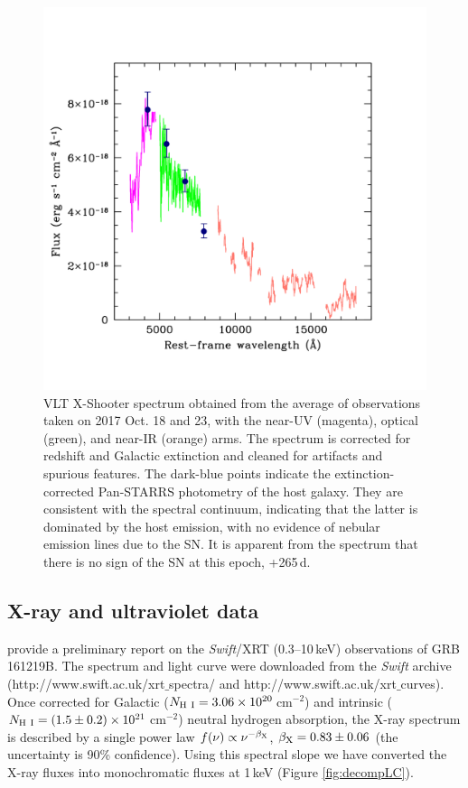 \documentclass[fleqn,usenatbib]{mnras}
\begin{document}
\begin{figure}
\centering
\includegraphics[scale=0.4]{plots/figure_E1_nebular.pdf}
\caption{VLT X-Shooter spectrum obtained from the average of observations taken on 2017 Oct. 18 and 23, with the near-UV (magenta), optical (green), and near-IR (orange) arms.  The spectrum is corrected for redshift and Galactic extinction and cleaned for artifacts and spurious features.  The dark-blue points indicate the extinction-corrected Pan-STARRS photometry of the host galaxy.  They are consistent with the spectral continuum, indicating that the latter is dominated by the host emission, with no evidence of nebular emission lines due to the SN. It is apparent from the spectrum that there is no sign of the SN at this epoch, +265\,d. }
\label{fig:latespec}
\end{figure}


\subsection{X-ray and ultraviolet data}

\citet{Mingo16} provide a preliminary report on the {\it Swift}/XRT (0.3--10\,keV) observations of GRB\,161219B.  The   spectrum and light curve were downloaded from  the {\it Swift} archive (http://www.swift.ac.uk/xrt$\_$spectra/
and http://www.swift.ac.uk/xrt$\_$curves). Once corrected for Galactic ($N_{\rm H~I} = 3.06 \times 10^{20}$\,cm$^{-2}$) and intrinsic ($N_{\rm H~I} = (1.5 \pm 0.2) \times 10^{21}$\,cm$^{-2}$) neutral hydrogen absorption, the X-ray spectrum is described by a single power law $f(\nu) \propto \nu^{-\beta_{\rm X}}$,  $\beta_{\rm X} = 0.83 \pm 0.06$ 
(the uncertainty is 90\% confidence).  Using this spectral slope we have converted the X-ray fluxes into monochromatic fluxes at 1\,keV (Figure \ref{fig:decompLC}).
\end{document}
